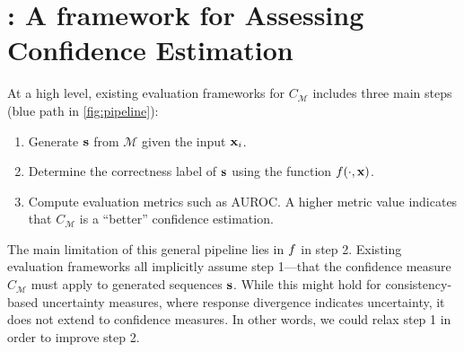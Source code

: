 \section{ \uqeval: A framework for Assessing Confidence Estimation}\label{sec:method}
At a high level, existing evaluation frameworks
for $C_{\mathcal{M}}$ includes three main steps (blue path in \cref{fig:pipeline}):
\begin{enumerate}[nosep]
    \item Generate $\mathbf{s}$ from $\mathcal{M}$ given the input $\mathbf{x}_i$.
    \item Determine the correctness label of $\mathbf{s}$ using the function $f(\cdot,\mathbf{x})$.
    \item Compute evaluation metrics such as AUROC. A higher metric value indicates that $C_{\mathcal{M}}$ is a ``better'' confidence estimation.
\end{enumerate}
The main limitation of this general pipeline lies in $f$ in step 2. 
Existing evaluation frameworks all implicitly assume step 1---that the confidence measure $C_{\mathcal{M}}$ must apply to generated sequences $\mathbf{s}$. 
While this might hold for consistency-based uncertainty measures, where response divergence indicates uncertainty, it does not extend to confidence measures. 
In other words, we could relax step 1 in order to improve step 2.



